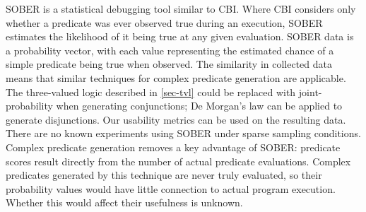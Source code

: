 SOBER \cite{1081753} is a statistical debugging tool similar to CBI\@.  Where CBI considers only whether a predicate was ever observed true during an execution, SOBER estimates the likelihood of it being true at any given evaluation.  SOBER data is a probability vector, with each value representing the estimated chance of a simple predicate being true when observed.  The similarity in collected data means that similar techniques for complex predicate generation are applicable.  The three-valued logic described in \autoref{sec-tvl} could be replaced with joint-probability when generating conjunctions; De Morgan's law can be applied to generate disjunctions.  Our usability metrics can be used on the resulting data.  There are no known experiments using SOBER under sparse sampling conditions.  Complex predicate generation removes a key advantage of SOBER: predicate scores result directly from the number of actual predicate evaluations.  Complex predicates generated by this technique are never truly evaluated, so their probability values would have little connection to actual program execution.  Whether this would affect their usefulness is unknown.

